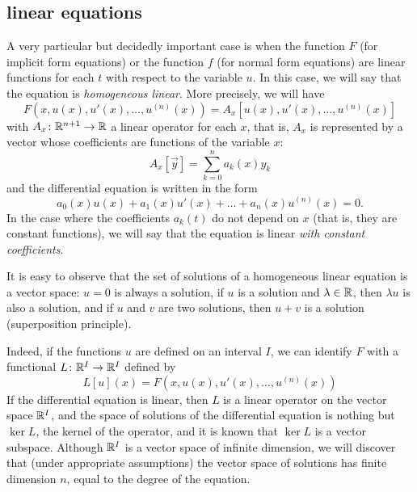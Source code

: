 \subsection{linear equations}

A very particular but decidedly important case is when the function
$F$ (for implicit form equations) or the function $f$
(for normal form equations) are linear functions
for each $t$
with respect to the variable $u$.
In this case, we will say that the equation is
%
%
\emph{homogeneous linear}.
More precisely, we will have
\[
F(x,u(x),u'(x), \dots, u^{(n)}(x)) = A_x[u(x), u'(x), \dots, u^{(n)}(x)]
\]
with $A_x\colon {\mathbb R}^{n+1}\to {\mathbb R}$
a linear operator for each $x$, that is, $A_x$ is represented by a vector
whose coefficients are functions of the variable $x$:
\[
  A_x[\vec y] = \sum_{k=0}^n a_k(x) y_k
\]
and the differential equation is written in the form
\[
  a_0(x) u(x) + a_1(x) u'(x) + \dots + a_n(x) u^{(n)}(x) = 0.
\]
In the case where the coefficients $a_k(t)$ do not depend on $x$
(that is, they are constant functions), we will say that the equation is
linear
%
%
\emph{with constant coefficients}.

It is easy to observe that the set of solutions of a homogeneous linear equation
is a vector space: $u=0$ is always a solution,
if $u$ is a solution and $\lambda \in {\mathbb R}$, then $\lambda u$ is also a solution,
and if $u$ and $v$ are two solutions, then $u+v$ is a solution
%
%
%
(superposition principle).

Indeed,
if the functions $u$ are defined on an interval $I$, we can
identify $F$ with a functional $L\colon {\mathbb R}^I \to {\mathbb R}^I$ defined by
\[
  L[u](x) = F(x,u(x), u'(x), \dots, u^{(n)}(x))
\]
If the differential equation is linear, then $L$ is a linear operator
on the vector space ${\mathbb R}^I$, and the space of solutions of the
differential equation is nothing but $\ker L$, the kernel of the operator,
and it is known that $\ker L$ is a vector subspace.
Although ${\mathbb R}^I$ is a vector space of infinite dimension, we will discover
that (under appropriate assumptions) the vector space of solutions
has finite dimension $n$, equal to the degree of the equation.

